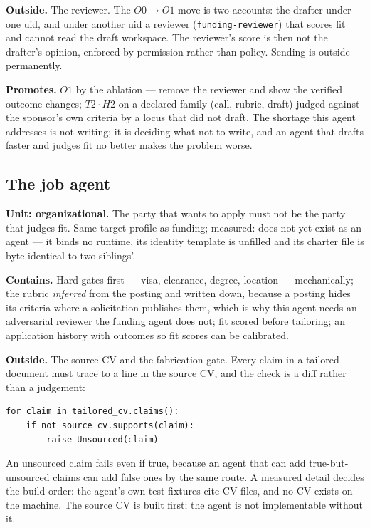 \textbf{Outside.} The reviewer. The $O0\to O1$ move is two accounts: the drafter under one uid, and under another uid a reviewer (\texttt{funding-reviewer}) that scores fit and cannot read the draft workspace. The reviewer's score is then not the drafter's opinion, enforced by permission rather than policy. Sending is outside permanently.

\textbf{Promotes.} $O1$ by the ablation --- remove the reviewer and show the verified outcome changes; $T2\cdot H2$ on a declared family (call, rubric, draft) judged against the sponsor's own criteria by a locus that did not draft. The shortage this agent addresses is not writing; it is deciding what not to write, and an agent that drafts faster and judges fit no better makes the problem worse.

\subsection{The job agent}\label{sec:job}

\textbf{Unit: organizational.} The party that wants to apply must not be the party that judges fit. Same target profile as funding; measured: does not yet exist as an agent --- it binds no runtime, its identity template is unfilled and its charter file is byte-identical to two siblings'.

\textbf{Contains.} Hard gates first --- visa, clearance, degree, location --- mechanically; the rubric \emph{inferred} from the posting and written down, because a posting hides its criteria where a solicitation publishes them, which is why this agent needs an adversarial reviewer the funding agent does not; fit scored before tailoring; an application history with outcomes so fit scores can be calibrated.

\textbf{Outside.} The source CV and the fabrication gate. Every claim in a tailored document must trace to a line in the source CV, and the check is a diff rather than a judgement:
\begin{verbatim}
for claim in tailored_cv.claims():
    if not source_cv.supports(claim):
        raise Unsourced(claim)
\end{verbatim}
An unsourced claim fails even if true, because an agent that can add true-but-unsourced claims can add false ones by the same route. A measured detail decides the build order: the agent's own test fixtures cite CV files, and no CV exists on the machine. The source CV is built first; the agent is not implementable without it.

